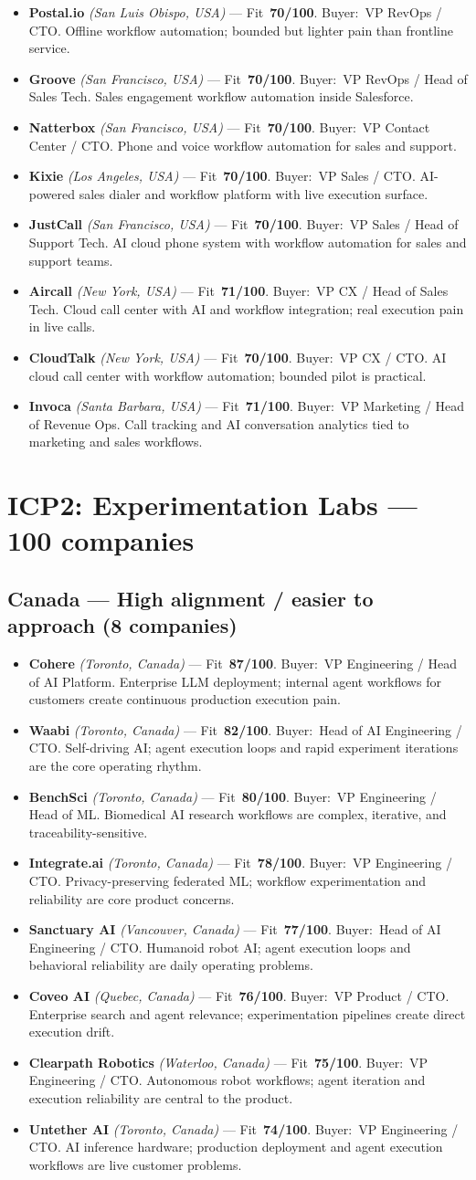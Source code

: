 \documentclass[10pt]{article}
\newcommand{\cand}[5]{\item \textbf{#1} \textit{(#2)} --- Fit~\textbf{#3/100}. Buyer:~#4. #5}
\newcommand{\topcand}[5]{\item \textcolor{green!50!black}{\textbf{#1} \textit{(#2)}} --- Fit~\textbf{#3/100}. Buyer:~#4. #5}
\begin{document}
\begin{itemize}
\cand{Postal.io}{San Luis Obispo, USA}{70}{VP RevOps / CTO}{Offline workflow automation; bounded but lighter pain than frontline service.}
\cand{Groove}{San Francisco, USA}{70}{VP RevOps / Head of Sales Tech}{Sales engagement workflow automation inside Salesforce.}
\cand{Natterbox}{San Francisco, USA}{70}{VP Contact Center / CTO}{Phone and voice workflow automation for sales and support.}
\cand{Kixie}{Los Angeles, USA}{70}{VP Sales / CTO}{AI-powered sales dialer and workflow platform with live execution surface.}
\cand{JustCall}{San Francisco, USA}{70}{VP Sales / Head of Support Tech}{AI cloud phone system with workflow automation for sales and support teams.}
\cand{Aircall}{New York, USA}{71}{VP CX / Head of Sales Tech}{Cloud call center with AI and workflow integration; real execution pain in live calls.}
\cand{CloudTalk}{New York, USA}{70}{VP CX / CTO}{AI cloud call center with workflow automation; bounded pilot is practical.}
\cand{Invoca}{Santa Barbara, USA}{71}{VP Marketing / Head of Revenue Ops}{Call tracking and AI conversation analytics tied to marketing and sales workflows.}
\end{itemize}
\clearpage
\section{ICP2: Experimentation Labs --- 100 companies}
\subsection{Canada --- High alignment / easier to approach (8 companies)}
\begin{itemize}
\topcand{Cohere}{Toronto, Canada}{87}{VP Engineering / Head of AI Platform}{Enterprise LLM deployment; internal agent workflows for customers create continuous production execution pain.}
\topcand{Waabi}{Toronto, Canada}{82}{Head of AI Engineering / CTO}{Self-driving AI; agent execution loops and rapid experiment iterations are the core operating rhythm.}
\cand{BenchSci}{Toronto, Canada}{80}{VP Engineering / Head of ML}{Biomedical AI research workflows are complex, iterative, and traceability-sensitive.}
\cand{Integrate.ai}{Toronto, Canada}{78}{VP Engineering / CTO}{Privacy-preserving federated ML; workflow experimentation and reliability are core product concerns.}
\cand{Sanctuary AI}{Vancouver, Canada}{77}{Head of AI Engineering / CTO}{Humanoid robot AI; agent execution loops and behavioral reliability are daily operating problems.}
\cand{Coveo AI}{Quebec, Canada}{76}{VP Product / CTO}{Enterprise search and agent relevance; experimentation pipelines create direct execution drift.}
\cand{Clearpath Robotics}{Waterloo, Canada}{75}{VP Engineering / CTO}{Autonomous robot workflows; agent iteration and execution reliability are central to the product.}
\cand{Untether AI}{Toronto, Canada}{74}{VP Engineering / CTO}{AI inference hardware; production deployment and agent execution workflows are live customer problems.}
\end{itemize}
\end{document}
